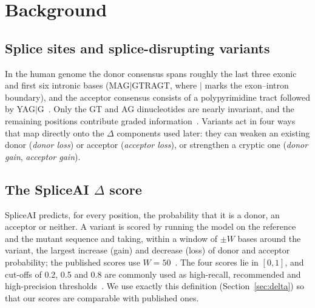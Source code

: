 \documentclass[conference]{IEEEtran}
\begin{document}
\section{Background}\label{sec:background}
\subsection{Splice sites and splice-disrupting variants}
In the human genome the donor consensus spans roughly the last three exonic and first six intronic bases (MAG$|$GTRAGT, where $|$ marks the exon--intron boundary), and the acceptor consensus consists of a polypyrimidine tract followed by YAG$|$G~\cite{lee2015splicing}. Only the GT and AG dinucleotides are nearly invariant, and the remaining positions contribute graded information~\cite{yeo2004maxent}. Variants act in four ways that map directly onto the $\Delta$ components used later: they can weaken an existing donor (\emph{donor loss}) or acceptor (\emph{acceptor loss}), or strengthen a cryptic one (\emph{donor gain}, \emph{acceptor gain}).

\subsection{The SpliceAI $\Delta$ score}
SpliceAI predicts, for every position, the probability that it is a donor, an acceptor or neither. A variant is scored by running the model on the reference and the mutant sequence and taking, within a window of $\pm W$ bases around the variant, the largest increase (gain) and decrease (loss) of donor and acceptor probability; the published scores use $W=50$~\cite{jaganathan2019spliceai}. The four scores lie in $[0,1]$, and cut-offs of 0.2, 0.5 and 0.8 are commonly used as high-recall, recommended and high-precision thresholds~\cite{jaganathan2019spliceai,walker2023clingen}. We use exactly this definition (Section~\ref{sec:delta}) so that our scores are comparable with published ones.
\end{document}
